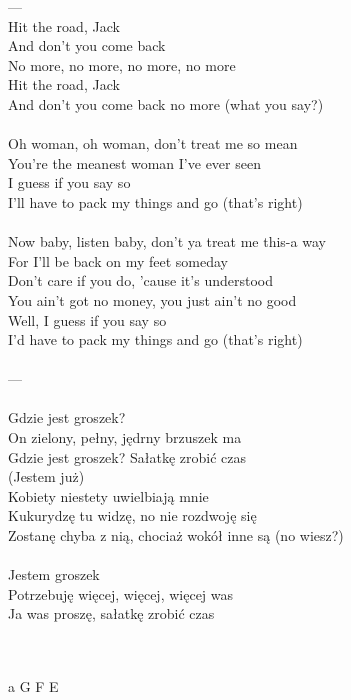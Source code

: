 \documentclass[a5paper, 10pt]{book}
\begin{document}
\begin{minipage}[t]{0.8\textwidth}
---\\

Hit the road, Jack\\
And don't you come back\\
No more, no more, no more, no more\\
Hit the road, Jack\\
And don't you come back no more (what you say?)\\
\\
Oh woman, oh woman, don't treat me so mean\\
You're the meanest woman I've ever seen\\
I guess if you say so\\
I'll have to pack my things and go (that's right)\\
\\
Now baby, listen baby, don't ya treat me this-a way\\
For I'll be back on my feet someday\\
Don't care if you do, 'cause it's understood\\
You ain't got no money, you just ain't no good\\
Well, I guess if you say so\\
I'd have to pack my things and go (that's right)\\
\\
---\\
\\
Gdzie jest groszek?\\
On zielony, pełny, jędrny brzuszek ma\\
Gdzie jest groszek? Sałatkę zrobić czas\\

(Jestem już)\\
Kobiety niestety uwielbiają mnie\\
Kukurydzę tu widzę, no nie rozdwoję się\\
Zostanę chyba z nią, chociaż wokół inne są (no wiesz?)\\
\\
Jestem groszek\\
Potrzebuję więcej, więcej, więcej was\\
Ja was proszę, sałatkę zrobić czas\\
\end{minipage}
\begin{minipage}[t]{0.2\textwidth}
~\\
~\\
a G F E\\
\end{minipage}
\end{document}
